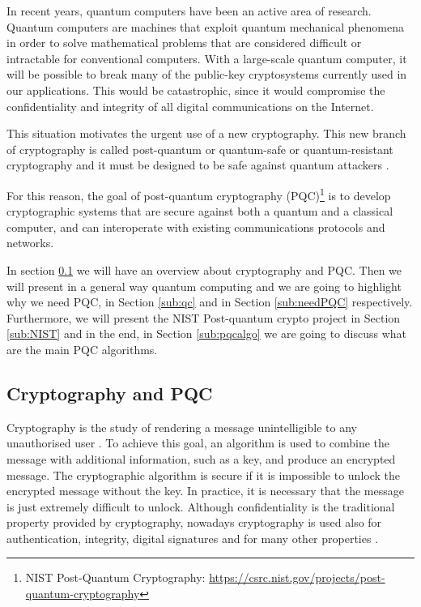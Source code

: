\documentclass[a4paper,12pt]{article}
\begin{document}
In recent years, quantum computers have been an active area of research. Quantum computers are machines that exploit quantum mechanical phenomena in order to solve mathematical problems that are considered difficult or intractable for conventional computers. With a large-scale quantum computer, it will be possible to break many of the public-key cryptosystems currently used in our applications. This would be catastrophic, since it would compromise the confidentiality and integrity of all digital communications on the Internet.

This situation motivates the urgent use of a new cryptography. This new branch of cryptography is called post-quantum or quantum-safe or quantum-resistant cryptography and it must be designed to be safe against quantum attackers \cite{10_postquantum_keyexchange}.

For this reason, the goal of post-quantum cryptography (PQC)\footnote{NIST Post-Quantum Cryptography: \url{https://csrc.nist.gov/projects/post-quantum-cryptography}} is to develop cryptographic systems that are secure against both a quantum and a classical computer, and can interoperate with existing communications protocols and networks. 

In section \ref{sub:intropqc} we will have an overview about cryptography and PQC. Then we will present in a general way quantum computing and we are going to highlight why we need PQC, in Section \ref{sub:qc} and in Section \ref{sub:needPQC} respectively. Furthermore, we will present the NIST Post-quantum crypto project in Section \ref{sub:NIST} and in the end, in Section \ref{sub:pqcalgo} we are going to discuss what are the main PQC algorithms.

\subsection{Cryptography and PQC}
\label{sub:intropqc}

Cryptography is the study of rendering a message unintelligible to any unauthorised user \cite{55_crypto}.
To achieve this goal, an algorithm is used to combine the message with additional information, such as a key, and produce an encrypted message.
The cryptographic algorithm is secure if it is impossible to unlock the encrypted message without the key. In practice, it is necessary that the message is just extremely difficult to unlock.
Although confidentiality is the traditional property provided by cryptography, nowadays cryptography is used also for authentication, integrity, digital signatures and for many other properties \cite{55_crypto}.
\end{document}
